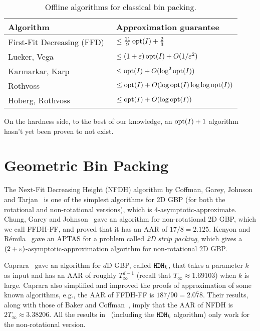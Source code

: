 \begin{table}[ht]
\centering
\caption{Offline algorithms for classical bin packing.}
\begin{tabular}{ll}
\toprule Algorithm & Approximation guarantee
\\ \midrule First-Fit Decreasing (FFD)~\cite{dosa2007tight}
    & $\le \frac{11}{9}\operatorname{opt}(I) + \frac{2}{3}$
\\[\defaultaddspace] Lueker, Vega~\cite{bp-aptas}
    & $\le (1+\varepsilon)\operatorname{opt}(I) + O(1/\varepsilon^2)$
\\[\defaultaddspace] Karmarkar, Karp~\cite{karmarkar-karp}
    & $\le \operatorname{opt}(I) + O(\log^2\operatorname{opt}(I))$
\\[\defaultaddspace] Rothvoss~\cite{rothvoss2013}
    & $\le \operatorname{opt}(I) + O(\log\operatorname{opt}(I)\log\log\operatorname{opt}(I))$
\\[\defaultaddspace] Hoberg, Rothvoss~\cite{HobergR17}
    & $\le \operatorname{opt}(I) + O(\log\operatorname{opt}(I))$
\\ \bottomrule
\end{tabular}
\label{table:offline-1bp}
\end{table}

On the hardness side, to the best of our knowledge,
an $\operatorname{opt}(I) + 1$ algorithm hasn't yet been proven to not exist.

\section{Geometric Bin Packing}

The Next-Fit Decreasing Height (NFDH) algorithm by
Coffman, Garey, Johnson and Tarjan~\cite{coffman1980performance}
is one of the simplest algorithms for 2D GBP
(for both the rotational and non-rotational versions),
which is 4-asymptotic-approximate.
Chung, Garey and Johnson~\cite{chung1982packing}
gave an algorithm for non-rotational 2D GBP, which we call FFDH-FF,
and proved that it has an AAR of $17/8 = 2.125$.
Kenyon and R\'emila~\cite{kenyon1996strip} gave an APTAS for
a problem called \emph{2D strip packing}, which gives a
$(2+\varepsilon)$-asymptotic-approximation algorithm for non-rotational 2D GBP.

Caprara~\cite{caprara2008} gave an algorithm for $d$D GBP, called $\operatorname{\mathtt{HDH}}_{k}$,
that takes a parameter $k$ as input and has an AAR of roughly
$T_{\infty}^{d-1}$ (recall that $T_{\infty} \approx 1.69103$) when $k$ is large.
Caprara also simplified and improved the proofs of approximation of some known algorithms,
e.g., the AAR of FFDH-FF is $187/90 = 2.0\overline{7}8$.
Their results, along with those of Baker and Coffman~\cite{baker1981tight},
imply that the AAR of NFDH is $2T_{\infty} \approx 3.38206$.
All the results in~\cite{caprara2008} (including the $\operatorname{\mathtt{HDH}}_{k}$ algorithm)
only work for the non-rotational version.


